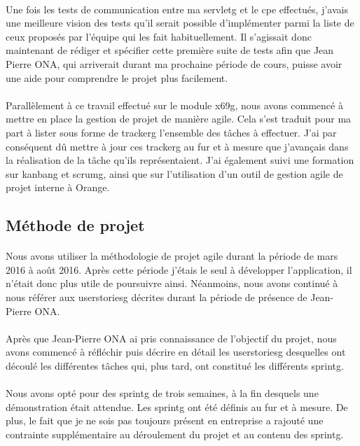 \documentclass[12pt,a4paper]{report}
\begin{document}
\paragraph*{}Une fois les tests de communication entre ma \gls{servletg} et le \gls{cpe} effectués, j’avais une meilleure vision des tests qu’il serait possible d’implémenter parmi la liste de ceux proposés par l’équipe qui les fait habituellement. Il s’agissait donc maintenant de rédiger et spécifier cette première suite de tests afin que Jean Pierre ONA, qui arriverait durant ma prochaine période de cours, puisse avoir une aide pour comprendre le projet plus facilement.
\paragraph*{}Parallèlement à ce travail effectué sur le module \gls{x69g}, nous avons
commencé à mettre en place la gestion de projet de manière agile. Cela s’est traduit pour ma part à lister sous forme de \gls{trackerg} l’ensemble des tâches à effectuer. J’ai par conséquent dû mettre à jour ces \gls{trackerg} au fur et à mesure que j’avançais dans la réalisation de la tâche qu’ils représentaient. J’ai également suivi une formation sur \gls{kanbang} et \gls{scrumg}, ainsi que sur l’utilisation d’un outil de gestion agile de projet interne à Orange. \\

\subsection{Méthode de projet}
\paragraph*{}Nous avons utiliser la méthodologie de projet agile durant la période de mars 2016 à août 2016. Après cette période j'étais le seul à développer l'application, il n'était donc plus utile de poursuivre ainsi. Néanmoins, nous avons continué à nous référer aux \gls{userstoriesg} décrites durant la période de présence de Jean-Pierre ONA. 
\paragraph*{}Après que Jean-Pierre ONA ai pris connaissance de l’objectif du projet, nous avons commencé à réfléchir puis décrire en détail les \gls{userstoriesg} desquelles ont découlé les différentes tâches qui, plus tard, ont constitué les différents \gls{sprintg}.
\paragraph*{}Nous avons opté pour des \gls{sprintg} de trois semaines, à la fin desquels une démonstration était attendue. Les \gls{sprintg} ont été définis au fur et à mesure. De plus, le fait que je ne sois pas toujours présent en entreprise a rajouté une contrainte supplémentaire au déroulement du projet et au contenu des \gls{sprintg}.
\end{document}
